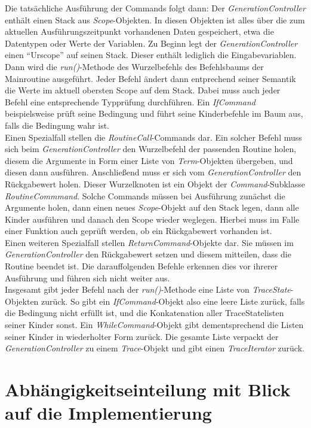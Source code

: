 \documentclass[parskip=full]{scrartcl}
\begin{document}
Die tatsächliche Ausführung der Commands folgt dann: Der \textit{GenerationController} enthält einen Stack aus \textit{Scope}-Objekten. 
In diesen Objekten ist alles über die zum aktuellen Ausführungszeitpunkt vorhandenen Daten gespeichert, etwa die Datentypen oder Werte der Variablen. 
Zu Beginn legt der \textit{GenerationController} einen \enquote{Urscope} auf seinen Stack. 
Dieser enthält lediglich die Eingabevariablen. 
Dann wird die \textit{run()}-Methode des Wurzelbefehls des Befehlsbaums der Mainroutine ausgeführt. 
Jeder Befehl ändert dann entprechend seiner Semantik die Werte im aktuell obersten Scope auf dem Stack. 
Dabei muss auch jeder Befehl eine entsprechende Typprüfung durchführen. 
Ein \textit{IfCommand} beispielsweise prüft seine Bedingung und führt seine Kinderbefehle im Baum aus, falls die Bedingung wahr ist. \\
Einen Spezialfall stellen die \textit{RoutineCall}-Commands dar. 
Ein solcher Befehl muss sich beim \textit{GenerationController} den Wurzelbefehl der passenden Routine holen, diesem die Argumente in Form einer Liste von \textit{Term}-Objekten übergeben, und diesen dann ausführen. 
Anschließend muss er sich vom \textit{GenerationController} den Rückgabewert holen. 
Dieser Wurzelknoten ist ein Objekt der \textit{Command}-Subklasse \textit{RoutineCommmand}. 
Solche Commands müssen bei Ausführung zunächst die Argumente holen, dann einen neues \textit{Scope}-Objekt auf den Stack legen, dann alle Kinder ausführen und danach den Scope wieder weglegen. 
Hierbei muss im Falle einer Funktion auch geprüft werden, ob ein Rückgabewert vorhanden ist.\\
Einen weiteren Spezialfall stellen \textit{ReturnCommand}-Objekte dar. 
Sie müssen im \textit{GenerationController} den Rückgabewert setzen und diesem mitteilen, dass die Routine beendet ist. 
Die darauffolgenden Befehle erkennen dies vor ihrerer Ausführung und führen sich nicht weiter aus. \\
Insgesamt gibt jeder Befehl nach der \textit{run()}-Methode eine Liste von  \textit{TraceState}-Objekten zurück. 
So gibt ein \textit{IfCommand}-Objekt also eine leere Liste zurück, falls die Bedingung nicht erfüllt ist, und die Konkatenation aller TraceStatelisten seiner Kinder sonst. 
Ein \textit{WhileCommand}-Objekt gibt dementsprechend die Listen seiner Kinder in wiederholter Form zurück. 
Die gesamte Liste verpackt der \textit{GenerationController} zu einem \textit{Trace}-Objekt und gibt einen \textit{TraceIterator} zurück.

\newpage
\section{Abhängigkeitseinteilung mit Blick auf die Implementierung}
\label{implementierung}
\end{document}
